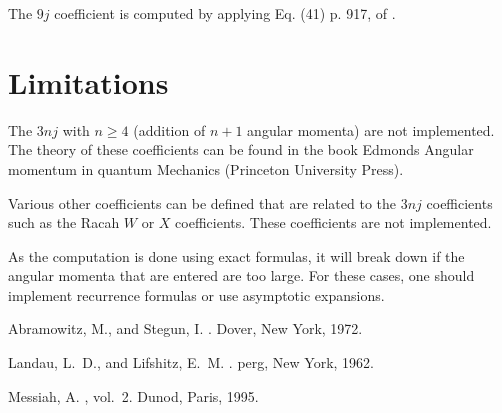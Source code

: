 \documentclass[11pt]{article}
\begin{document}
The $9j$ coefficient is computed by applying Eq. (41) p. 917, of \cite{messiah_field_chapter}. 


\section{Limitations}

The $3nj$ with $n\ge 4$ (addition of $n+1$ angular momenta) are not 
implemented. The theory of these coefficients 
can be found in the book Edmonds Angular momentum 
in quantum Mechanics (Princeton University Press). 

Various other coefficients can be defined that are related to the $3nj$ 
coefficients such as the Racah $W$ or $X$ coefficients\cite{messiah_field_chapter}. These coefficients are not implemented.

 
As the computation is done using exact formulas, it will break down if the
angular momenta that are entered are too large. For these cases, one should
implement recurrence formulas or use asymptotic expansions. 
 


\begin{thebibliography}{1}

{\sc Abramowitz, M., and Stegun, I.}
.
\newblock Dover, New York, 1972.

{\sc Landau, L.~D., and Lifshitz, E.~M.}
.
\newblock perg, New York, 1962.

{\sc Messiah, A.}
, vol.~2.
\newblock Dunod, Paris, 1995.

\end{thebibliography}
\end{document}
